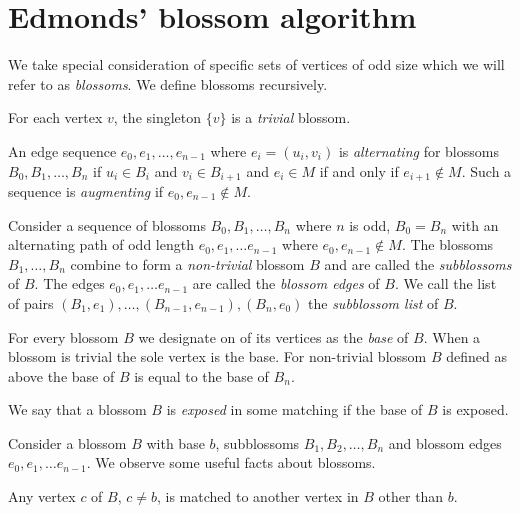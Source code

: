 \section{Edmonds' blossom algorithm}

We take special consideration of specific sets of vertices of odd size which we will refer to as \textit{blossoms}. We define blossoms recursively.

\begin{defn}
    For each vertex $v$, the singleton $\{ v \}$ is a \emph{trivial} blossom.
\end{defn}

An edge sequence $e_0, e_1, \dots, e_{n-1}$ where $e_i=(u_i, v_i)$ is \emph{alternating} for blossoms $B_0, B_1, \dots, B_n$ if $u_i \in B_i$ and $v_i \in B_{i+1}$ and $e_i \in M$ if and only if $e_{i+1} \notin M$. Such a sequence is \textit{augmenting} if $e_0, e_{n-1} \notin M$.

\begin{defn}
    Consider a sequence of blossoms $B_0, B_1, \dots, B_n$ where $n$ is odd, $B_0 = B_n$ with an alternating path of odd length $e_0, e_1, \dots e_{n-1}$ where $e_0, e_{n - 1} \notin M$. The blossoms $B_1, \dots, B_n$ combine to form a \emph{non-trivial} blossom $B$ and are called the \emph{subblossoms} of $B$. The edges $e_0, e_1, \dots e_{n-1}$ are called the \emph{blossom edges} of $B$. We call the list of pairs $(B_1, e_1), \dots, (B_{n-1}, e_{n-1}), (B_n, e_0)$ the \emph{subblossom list} of $B$.
\end{defn}

\begin{defn}[base]
    For every blossom $B$ we designate on of its vertices as the \textit{base} of $B$. When a blossom is trivial the sole vertex is the base. For non-trivial blossom $B$ defined as above the base of $B$ is equal to the base of $B_n$.
\end{defn}

We say that a blossom $B$ is \emph{exposed} in some matching if the base of $B$ is exposed.

Consider a blossom $B$ with base $b$, subblossoms $B_1, B_2, \dots, B_n$ and blossom edges $e_0, e_1, \dots e_{n-1}$. We observe some useful facts about blossoms.

\begin{fact}\label{fact:blossom_mate}
    Any vertex $c$ of $B$, $c \neq b$, is matched to another vertex in $B$ other than $b$.
\end{fact}

